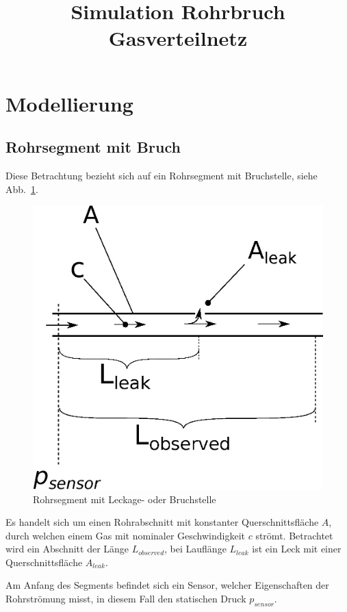\documentclass[a4paper,10pt,twocolumn]{article}
\title{Simulation Rohrbruch Gasverteilnetz}
\author{}
\date{}
\begin{document}
\maketitle

\section{Modellierung}

\subsection{Rohrsegment mit Bruch}

Diese Betrachtung bezieht sich auf ein Rohrsegment mit Bruchstelle, siehe Abb.~\ref{fig:bruch}.

\begin{figure}[hbp]
\centering
\includegraphics[width=0.9\hsize]{bruch.eps}
\caption{Rohrsegment mit Leckage- oder Bruchstelle}
\label{fig:bruch}
\end{figure}

Es handelt sich um einen Rohrabschnitt mit konstanter Querschnittsfläche $A$, durch welchen einem Gas mit nominaler Geschwindigkeit $c$ strömt. Betrachtet wird ein Abschnitt der Länge $L_\mathit{observed}$, bei Lauflänge $L_\mathit{leak}$ ist ein Leck mit einer Querschnittsfläche $A_\mathit{leak}$.

Am Anfang des Segments befindet sich ein Sensor, welcher Eigenschaften der Rohrströmung misst, in diesem Fall den statischen Druck $p_\textit{sensor}$.
\end{document}

